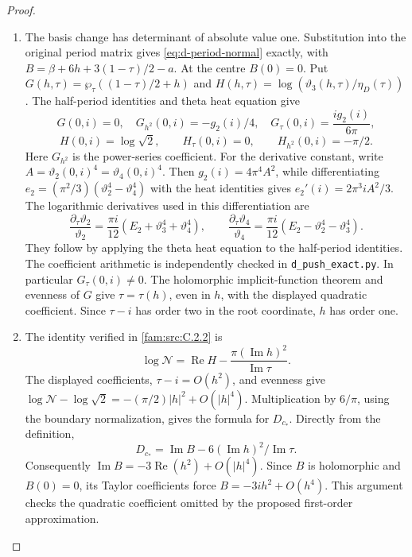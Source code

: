 \begin{proof}
\begin{enumerate}[label=\arabic*.,leftmargin=*]
\item The basis change has determinant of absolute value one. Substitution
into the original period matrix gives \eqref{eq:d-period-normal}
exactly, with
\(B=\beta+6h+3(1-\tau)/2-a\).
At the centre \(B(0)=0\). Put
\(G(h,\tau)=\wp_\tau((1-\tau)/2+h)\) and
\(H(h,\tau)=\log(\vartheta_3(h,\tau)/\eta_D(\tau))\).
The half-period identities and theta heat equation give
\[
 G(0,i)=0,\quad G_{h^2}(0,i)=-g_2(i)/4,\quad
 G_\tau(0,i)=\frac{i g_2(i)}{6\pi},
\]
\[
 H(0,i)=\log\sqrt2,\qquad H_\tau(0,i)=0,\qquad
 H_{h^2}(0,i)=-\pi/2.
\]
Here \(G_{h^2}\) is the power-series coefficient. For the derivative
constant, write \(A=\vartheta_2(0,i)^4=\vartheta_4(0,i)^4\).
Then \(g_2(i)=4\pi^4A^2\), while differentiating
\(e_2=(\pi^2/3)(\vartheta_2^4-\vartheta_4^4)\) with the heat
identities gives \(e_2'(i)=2\pi^3iA^2/3\).
The logarithmic derivatives used in this differentiation are
\[
 \frac{\partial_\tau\vartheta_2}{\vartheta_2}
  =\frac{\pi i}{12}(E_2+\vartheta_3^4+\vartheta_4^4),\qquad
 \frac{\partial_\tau\vartheta_4}{\vartheta_4}
  =\frac{\pi i}{12}(E_2-\vartheta_2^4-\vartheta_3^4).
\]
They follow by applying the theta heat equation to the half-period
identities. The coefficient arithmetic is independently checked in
\texttt{d\_push\_exact.py}. In particular \(G_\tau(0,i)\ne0\).
The holomorphic implicit-function theorem and evenness of \(G\) give
\(\tau=\tau(h)\), even in \(h\), with the displayed quadratic
coefficient. Since \(\tau-i\) has order two in the root coordinate,
\(h\) has order one.

\item The identity verified in \cref{fam:src:C.2.2} is
\[
 \log\mathcal N=\operatorname{Re}H-
       \frac{\pi(\operatorname{Im}h)^2}{\operatorname{Im}\tau}.
\]
The displayed coefficients, \(\tau-i=O(h^2)\), and evenness give
\(\log\mathcal N-\log\sqrt2=-(\pi/2)|h|^2+O(|h|^4)\).
Multiplication by \(6/\pi\), using the boundary normalization, gives
the formula for \(D_{c_*}\). Directly from the definition,
\[
 D_{c_*}=\operatorname{Im}B-
             6(\operatorname{Im}h)^2/\operatorname{Im}\tau.
\]
Consequently \(\operatorname{Im}B=-3\operatorname{Re}(h^2)
+O(|h|^4)\). Since \(B\) is holomorphic and \(B(0)=0\), its Taylor
coefficients force \(B=-3ih^2+O(h^4)\). This argument checks the
quadratic coefficient omitted by the proposed first-order approximation.
\end{enumerate}
\end{proof}

